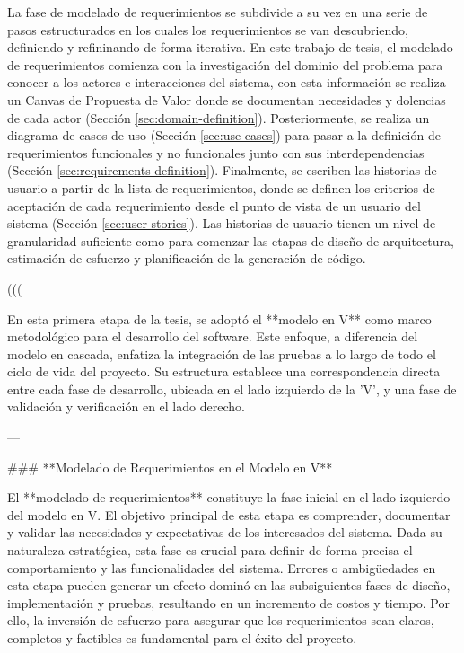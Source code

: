 La fase de modelado de requerimientos se subdivide a su vez en una serie de pasos estructurados en los cuales los requerimientos se van descubriendo, definiendo y refininando de forma iterativa. En este trabajo de tesis, el modelado de requerimientos comienza con la investigación del dominio del problema para conocer a los actores e interacciones del sistema, con esta información se realiza un Canvas de Propuesta de Valor donde se documentan necesidades y dolencias de cada actor (Sección \ref{sec:domain-definition}). Posteriormente, se realiza un diagrama de casos de uso (Sección \ref{sec:use-cases}) para pasar a la definición de requerimientos funcionales y no funcionales junto con sus interdependencias (Sección \ref{sec:requirements-definition}). Finalmente, se escriben las historias de usuario a partir de la lista de requerimientos, donde se definen los criterios de aceptación de cada requerimiento desde el punto de vista de un usuario del sistema (Sección \ref{sec:user-stories}). Las historias de usuario tienen un nivel de granularidad suficiente como para comenzar las etapas de diseño de arquitectura, estimación de esfuerzo y planificación de la generación de código.


(((

En esta primera etapa de la tesis, se adoptó el **modelo en V** como marco metodológico para el desarrollo del software. Este enfoque, a diferencia del modelo en cascada, enfatiza la integración de las pruebas a lo largo de todo el ciclo de vida del proyecto. Su estructura establece una correspondencia directa entre cada fase de desarrollo, ubicada en el lado izquierdo de la 'V', y una fase de validación y verificación en el lado derecho.

---

### **Modelado de Requerimientos en el Modelo en V**

El **modelado de requerimientos** constituye la fase inicial en el lado izquierdo del modelo en V. El objetivo principal de esta etapa es comprender, documentar y validar las necesidades y expectativas de los interesados del sistema. Dada su naturaleza estratégica, esta fase es crucial para definir de forma precisa el comportamiento y las funcionalidades del sistema. Errores o ambigüedades en esta etapa pueden generar un efecto dominó en las subsiguientes fases de diseño, implementación y pruebas, resultando en un incremento de costos y tiempo. Por ello, la inversión de esfuerzo para asegurar que los requerimientos sean claros, completos y factibles es fundamental para el éxito del proyecto.

